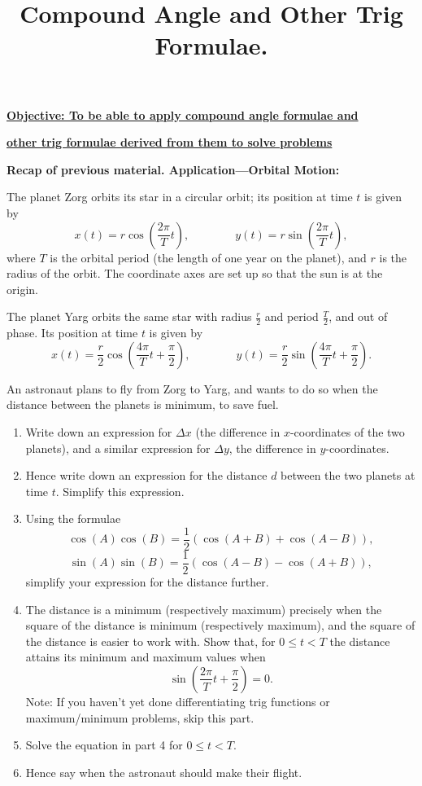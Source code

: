 \documentclass{article}
\begin{document}
\title{Compound Angle and Other Trig Formulae.}
\date{}

\maketitle
\thispagestyle{empty}

\Large

\textbf{\underline{Objective: To be able to apply compound angle formulae and}}

\textbf{\underline{other trig formulae derived from them to solve problems}}




\vspace{5mm}


\textbf{Recap of previous material. Application---Orbital Motion:}

\vspace{5mm}



The planet Zorg orbits its star in a circular orbit; its position at time $t$ is given by
\[x(t)=r\cos\left(\frac{2\pi}{T}t\right),\qquad\qquad y(t)=r\sin\left(\frac{2\pi}{T}t\right),\]
where $T$ is the orbital period (the length of one year on the planet), and $r$ is the radius of the orbit. The coordinate axes are set up so that the sun is at the origin.

The planet Yarg orbits the same star with radius $\frac{r}{2}$ and period $\frac{T}{2}$, and out of phase. Its position at time $t$ is given by
\[x(t)=\frac{r}{2}\cos\left(\frac{4\pi}{T}t+\frac{\pi}{2}\right),\qquad\qquad y(t)=\frac{r}{2}\sin\left(\frac{4\pi}{T}t+\frac{\pi}{2}\right).\]


An astronaut plans to fly from Zorg to Yarg, and wants to do so when the distance between the planets is minimum, to save fuel.

\begin{enumerate}
\item Write down an expression for $\Delta x$ (the difference in $x$-coordinates of the two planets), and a similar expression for $\Delta y$, the difference in $y$-coordinates.
\item Hence write down an expression for the distance $d$ between the two planets at time $t$. Simplify this expression.
\item Using the formulae
	\[\cos(A)\cos(B)=\frac{1}{2}(\cos(A+B)+\cos(A-B)),\]
	\[\sin(A)\sin(B)=\frac{1}{2}(\cos(A-B)-\cos(A+B)),\]
	simplify your expression for the distance further.
\item The distance is a minimum (respectively maximum) precisely when the square of the distance is minimum (respectively maximum), and the square of the distance is easier to work with. 		Show that, for $0\leq t<T$ the distance attains its minimum and maximum values when
	\[\sin\left(\frac{2\pi}{T}t+\frac{\pi}{2}\right)=0.\]
	Note: If you haven't yet done differentiating trig func\-tions or max\-i\-mum/min\-i\-m\-um prob\-lems, skip this part.
\item Solve the equation in part 4 for $0\leq t<T$.
\item Hence say when the astronaut should make their flight.
\end{enumerate}
\end{document}
